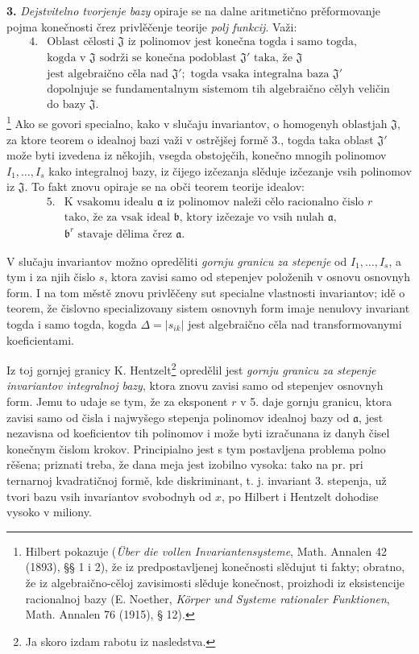 \documentclass[11pt]{article}
\providecommand{\mJ}{\mathfrak J}
\providecommand{\ma}{\mathfrak a}
\providecommand{\mb}{\mathfrak b}
\providecommand{\D}{\Delta}
\begin{document}
\textbf{3.} \emph{Dejstvitelno tvorjenje bazy} opiraje se na dalne aritmetično prěformovanje pojma konečnosti črez privlěčenje teorije \emph{polj funkcij}. Važi:
\[
\begin{array}{ll}
4.& \text{Oblast cělosti }\mJ\text{ iz polinomov jest konečna togda i samo togda,}\\
& \text{kogda v }\mJ\text{ sodrži se konečna podoblast }\mJ'\text{ taka, že }\mJ\\
& \text{jest algebraično cěla nad }\mJ';\text{ togda vsaka integralna baza }\mJ'\\
& \text{dopolnjuje se fundamentalnym sistemom tih algebraično cělyh veličin}\\
& \text{do bazy }\mJ.
\end{array}
\]
\footnote{Hilbert pokazuje (\emph{Über die vollen Invariantensysteme}, Math. Annalen 42 (1893), §§ 1 i 2), že iz predpostavljenej konečnosti slědujut ti fakty; obratno, že iz algebraično-cěloj zavisimosti slěduje konečnost, proizhodi iz eksistencije racionalnoj bazy (E. Noether, \emph{Körper und Systeme rationaler Funktionen}, Math. Annalen 76 (1915), § 12).}
Ako se govori specialno, kako v slučaju invariantov, o homogenyh oblastjah $\mJ$, za ktore teorem o idealnoj bazi važi v ostrějšej formě 3., togda taka oblast $\mJ'$ može byti izvedena iz někojih, vsegda obstojęčih, konečno mnogih polinomov $I_1,\ldots,I_s$ kako integralnoj bazy, iz čijego izčezanja slěduje izčezanje vsih polinomov iz $\mJ$. To fakt znovu opiraje se na obči teorem teorije idealov:
\[
\begin{array}{ll}
5.& \text{K vsakomu idealu }\ma\text{ iz polinomov naleži cělo racionalno čislo }r\\
& \text{tako, že za vsak ideal }\mb\text{, ktory izčezaje vo vsih nulah }\ma,\\
& \mb^r\text{ stavaje dělima črez }\ma.
\end{array}
\]

V slučaju invariantov možno opreděliti \emph{gornju granicu za stepenje} od $I_1,\ldots,I_s$, a tym i za njih čislo $s$, ktora zavisi samo od stepenjev položenih v osnovu osnovnyh form. I na tom městě znovu privlěčeny sut specialne vlastnosti invariantov; idě o teorem, že čislovno specializovany sistem osnovnyh form imaje nenulovy invariant togda i samo togda, kogda $\D=|s_{ik}|$ jest algebraično cěla nad transformovanymi koeficientami.

Iz toj gornjej granicy K. Hentzelt\footnote{Ja skoro izdam rabotu iz nasledstva.} opredělil jest \emph{gornju granicu za stepenje invariantov integralnoj bazy}, ktora znovu zavisi samo od stepenjev osnovnyh form. Jemu to udaje se tym, že za eksponent $r$ v 5. daje gornju granicu, ktora zavisi samo od čisla i najwyšego stepenja polinomov idealnoj bazy od $\ma$, jest nezavisna od koeficientov tih polinomov i može byti izračunana iz danyh čisel konečnym čislom krokov. Principialno jest s tym postavljena problema polno rěšena; priznati treba, že dana meja jest izobilno vysoka: tako na pr. pri ternarnoj kvadratičnoj formě, kde diskriminant, t. j. invariant 3. stepenja, už tvori bazu vsih invariantov svobodnyh od $x$, po Hilbert i Hentzelt dohodise vysoko v miliony.
\end{document}
